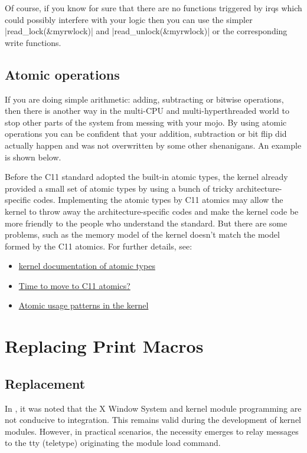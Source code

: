 \documentclass[10pt, oneside]{book}
\begin{document}

Of course, if you know for sure that there are no functions triggered by irqs which could possibly interfere with your logic then you can use the simpler \cpp|read_lock(&myrwlock)| and \cpp|read_unlock(&myrwlock)| or the corresponding write functions.
\subsection{Atomic operations}
\label{sec:atomics}
If you are doing simple arithmetic: adding, subtracting or bitwise operations, then there is another way in the multi-CPU and multi-hyperthreaded world to stop other parts of the system from messing with your mojo.
By using atomic operations you can be confident that your addition, subtraction or bit flip did actually happen and was not overwritten by some other shenanigans.
An example is shown below.


Before the C11 standard adopted the built-in atomic types, the kernel already provided a small set of atomic types by using a bunch of tricky architecture-specific codes.
Implementing the atomic types by C11 atomics may allow the kernel to throw away the architecture-specific codes and make the kernel code be more friendly to the people who understand the standard.
But there are some problems, such as the memory model of the kernel doesn't match the model formed by the C11 atomics.
For further details, see:
\begin{itemize}
  \item \href{https://www.kernel.org/doc/Documentation/atomic_t.txt}{kernel documentation of atomic types}
  \item \href{https://lwn.net/Articles/691128/}{Time to move to C11 atomics?}
  \item \href{https://lwn.net/Articles/698315/}{Atomic usage patterns in the kernel}
\end{itemize}

\section{Replacing Print Macros}
\label{sec:print_macros}
\subsection{Replacement}
In , it was noted that the X Window System and kernel module programming are not conducive to integration.
This remains valid during the development of kernel modules.
However, in practical scenarios, the necessity emerges to relay messages to the tty (teletype) originating the module load command.
\end{document}
